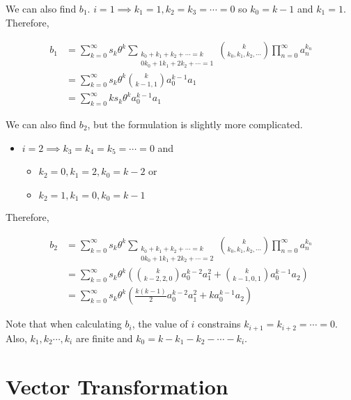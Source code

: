 \documentclass{article}
\begin{document}
\noindent
We can also find $b_1$. $i = 1 \implies k_1 = 1, k_2 = k_3 = \cdots = 0$ so $k_0 = k - 1$ and $k_1 = 1$. Therefore,

\begin{align*}
    b_1
    &= \sum_{k=0}^{\infty} s_k \theta^k \sum_{\substack{k_0 + k_1 + k_2 + \cdots = k \\ 0 k_0 + 1 k_1 + 2 k_2 + \cdots = 1}} \binom{k}{k_0, k_1, k_2, \cdots} \prod_{n=0}^{\infty} a_n^{k_n} \\
    &= \sum_{k=0}^{\infty} s_k \theta^k \binom{k}{k - 1, 1} a_0^{k - 1} a_1 \\
    &= \sum_{k=0}^{\infty} k s_k \theta^k a_0^{k-1} a_1
\end{align*}

\noindent
We can also find $b_2$, but the formulation is slightly more complicated. 

\begin{itemize}
    \item $i = 2 \implies k_3 = k_4 = k_5 = \cdots = 0$ and
    \begin{itemize}
        \item $k_2 = 0, k_1 = 2, k_0 = k - 2$ or
        \item $k_2 = 1, k_1 = 0, k_0 = k - 1$
    \end{itemize}
\end{itemize}

\noindent
Therefore,

\begin{align*}
    b_2
    &= \sum_{k=0}^{\infty} s_k \theta^k \sum_{\substack{k_0 + k_1 + k_2 + \cdots = k \\ 0 k_0 + 1 k_1 + 2 k_2 + \cdots = 2}} \binom{k}{k_0, k_1, k_2, \cdots} \prod_{n=0}^{\infty} a_n^{k_n} \\
    &= \sum_{k=0}^{\infty} s_k \theta^k \left(\binom{k}{k - 2, 2, 0}a_0^{k-2} a_1^{2} + \binom{k}{k - 1, 0, 1}a_0^{k-1} a_2\right) \\
    &= \sum_{k=0}^{\infty} s_k \theta^k \left(\frac{k(k-1)}{2} a_0^{k-2}a_1^{2} + k a_0^{k-1}a_2\right)
\end{align*}

\noindent
Note that when calculating $b_i$, the value of $i$ constrains $k_{i+1} = k_{i+2} = \cdots = 0$. Also, $k_1, k_2 \cdots, k_i$ are finite and $k_0 = k - k_1 - k_2 - \cdots - k_i$.

\section{Vector Transformation}
\end{document}
